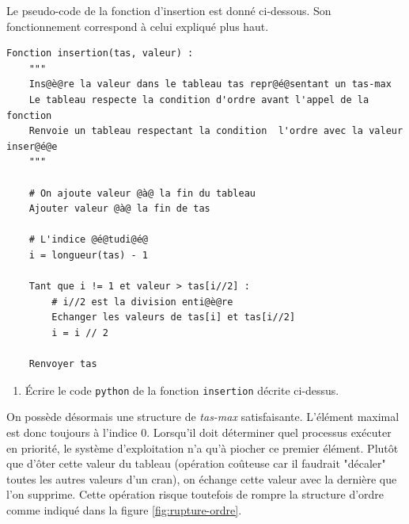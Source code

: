 \documentclass[a4paper, 11pt]{article}
\begin{document}
Le pseudo-code de la fonction d'insertion est donné ci-dessous.
Son fonctionnement correspond à celui expliqué plus haut.

\begin{lstlisting}[style=stylepseudo]
Fonction insertion(tas, valeur) :
	"""
	Ins@è@re la valeur dans le tableau tas repr@é@sentant un tas-max
	Le tableau respecte la condition d'ordre avant l'appel de la fonction
	Renvoie un tableau respectant la condition  l'ordre avec la valeur inser@é@e
	"""
	
	# On ajoute valeur @à@ la fin du tableau
	Ajouter valeur @à@ la fin de tas
	
	# L'indice @é@tudi@é@
	i = longueur(tas) - 1

	Tant que i != 1 et valeur > tas[i//2] : 
		# i//2 est la division enti@è@re
		Echanger les valeurs de tas[i] et tas[i//2]
		i = i // 2
		
	Renvoyer tas
\end{lstlisting}

\begin{enumerate}[resume*]
	\item \'Ecrire le code \texttt{python} de la fonction \texttt{insertion} décrite ci-dessus.
\end{enumerate}

On possède désormais une structure de \textit{tas-max} satisfaisante.
L'élément maximal est donc toujours à l'indice $0$.
Lorsqu'il doit déterminer quel processus exécuter en priorité, le système d'exploitation n'a qu'à piocher ce premier élément.
Plutôt que d'ôter cette valeur du tableau (opération coûteuse car il faudrait "décaler" toutes les autres valeurs d'un cran), on échange cette valeur avec la dernière que l'on supprime.
Cette opération risque toutefois de rompre la structure d'ordre comme indiqué dans la figure \ref{fig:rupture-ordre}.
\end{document}
